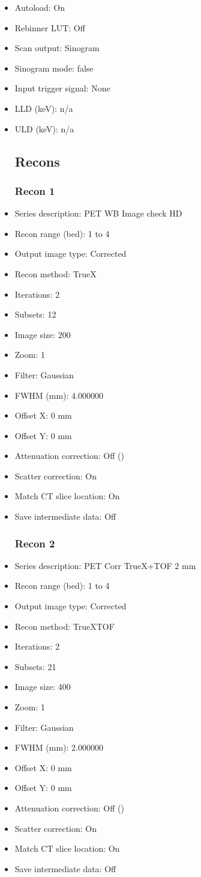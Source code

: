 \documentclass[12pt]{article}
\begin{document}
\begin{itemize}
\subsection{Scan}
\item Autoload: On
\item Rebinner LUT: Off
\item Scan output: Sinogram
\item Sinogram mode: false
\item Input trigger signal: None
\item LLD (keV): n/a
\item ULD (keV): n/a
\subsection{Recons}
\subsubsection{Recon 1}
\item Series description: PET WB Image check HD
\item Recon range (bed): 1 to 4
\item Output image type: Corrected
\item Recon method: TrueX
\item Iterations: 2
\item Subsets: 12
\item Image size: 200
\item Zoom: 1
\item Filter: Gaussian
\item FWHM (mm): 4.000000
\item Offset X: 0 mm
\item Offset Y: 0 mm
\item Attenuation correction: Off ()
\item Scatter correction: On
\item Match CT slice location: On
\item Save intermediate data: Off
\subsubsection{Recon 2}
\item Series description: PET  Corr  TrueX+TOF 2 mm
\item Recon range (bed): 1 to 4
\item Output image type: Corrected
\item Recon method: TrueXTOF
\item Iterations: 2
\item Subsets: 21
\item Image size: 400
\item Zoom: 1
\item Filter: Gaussian
\item FWHM (mm): 2.000000
\item Offset X: 0 mm
\item Offset Y: 0 mm
\item Attenuation correction: Off ()
\item Scatter correction: On
\item Match CT slice location: On
\item Save intermediate data: Off

\end{itemize}
\end{document}
